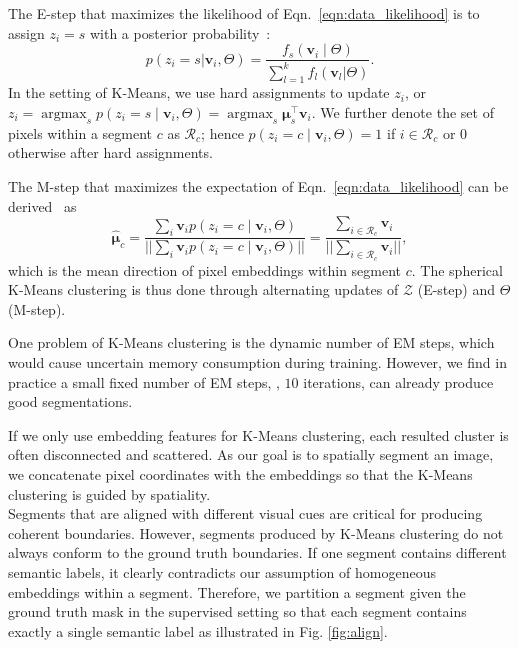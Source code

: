 \documentclass[10pt,twocolumn,letterpaper]{article}
\DeclareMathOperator*{\argmax}{argmax}
\begin{document}
The E-step that maximizes the likelihood of Eqn.~\ref{eqn:data_likelihood} is to assign $z_i=s$ with a posterior probability~\cite{neal1998view}:
\begin{equation}
\label{eqn:posterior}
    p(z_i=s|\pmb{v}_i, \Theta) = \frac{f_s(\pmb{v}_i \mid \Theta)}{\sum_{l=1}^k f_l(\pmb{v}_l|\Theta)}.
\end{equation}
In the setting of K-Means, we use hard assignments to update $z_i$, or $z_i = \argmax_{s} p(z_i=s\mid \pmb{v}_i, \Theta)=\argmax_{s} \pmb{\mu}_{s}^\top \pmb{v}_i$. We further denote the set of pixels within a segment $c$ as $\mathcal{R}_c$; hence $p(z_i=c\mid \pmb{v}_i, \Theta)=1$ if $i\in \mathcal{R}_c$ or $0$ otherwise after hard assignments.


The M-step that maximizes the expectation of Eqn.~\ref{eqn:data_likelihood} can be derived~\cite{banerjee2005clustering} as
\begin{equation}
\label{eqn:vmf_mu}
\hat{\pmb{\mu}}_c = \frac{\sum_i \pmb{v}_i p(z_i=c\mid \pmb{v}_i, \Theta)}{||\sum_i \pmb{v}_i p(z_i=c\mid \pmb{v}_i, \Theta)||} = \frac{\sum_{i \in \mathcal{R}_c} \pmb{v}_i}{|| \sum_{i \in \mathcal{R}_c} \pmb{v}_i ||},
\end{equation}
which is the mean direction of pixel embeddings within segment $c$.
The spherical K-Means clustering is thus done through alternating updates of $\mathcal{Z}$ (E-step) and $\Theta$ (M-step).





One problem of K-Means clustering is the dynamic number of EM steps, which would cause uncertain memory consumption during training.
However, we find in practice a small fixed number of EM steps, \ie, $10$ iterations, can already produce good segmentations.


If we only use embedding features for K-Means clustering, each resulted cluster is often disconnected and scattered.
As our goal is to spatially segment an image, we concatenate pixel coordinates with the embeddings so that the K-Means clustering is guided by spatiality. \\


 Segments that are aligned with different visual cues are critical for producing coherent boundaries. However, segments produced by K-Means clustering do not always conform to the ground truth boundaries.
If one segment contains different semantic labels, it clearly contradicts our assumption of homogeneous embeddings within a segment.
Therefore, we partition a segment given the ground truth mask in the supervised setting so that each segment contains exactly a single semantic label as illustrated in Fig. \ref{fig:align}.
\end{document}
